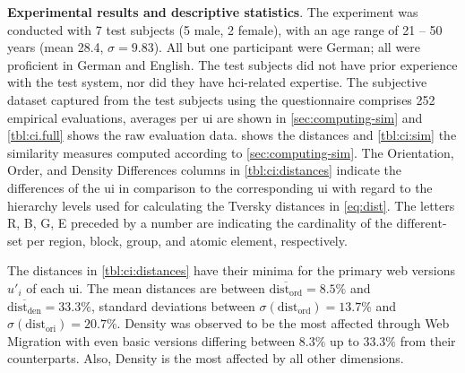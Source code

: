 \textbf{Experimental results and descriptive statistics}.
The experiment was conducted with 7 test subjects (5 male, 2 female), with an age range of 21 -- 50 years (mean 28.4, \(\sigma = 9.83\)).
All but one participant were German; all were proficient in German and English.
The test subjects did not have prior experience with the test system, nor did they have \gls{hci}-related expertise.
The subjective dataset captured from the test subjects using the questionnaire comprises 252 empirical evaluations, averages per \gls{ui} are shown in \cref{sec:computing-sim} and \cref{tbl:ci.full} shows the raw evaluation data.
 shows the distances and \cref{tbl:ci:sim} the similarity measures computed according to \cref{sec:computing-sim}.
The Orientation, Order, and Density Differences columns in \cref{tbl:ci:distances} indicate the differences of the \gls{ui} in comparison to the corresponding  \gls{ui} with regard to the hierarchy levels used for calculating the Tversky distances in \cref{eq:dist}.
The letters R, B, G, E preceded by a number are indicating the cardinality of the \(\text{different}\)-set per region, block, group, and atomic element, respectively.

The distances in \cref{tbl:ci:distances} have their minima for the primary \gls{web} versions \(u'_i\) of each \gls{ui}.
The mean distances are between \(\overline{\text{dist}_{\text{ord}}}=8.5\%\) and \(\overline{\text{dist}_{\text{den}}}=33.3\%\), standard deviations between \(\sigma(\text{dist}_{\text{ord}})=13.7\%\) and \(\sigma(\text{dist}_{\text{ori}})=20.7\%\).
Density was observed to be the most affected through \gls{Web Migration} with even basic versions differing between \(8.3\%\) up to \(33.3\%\) from their  counterparts.
Also, Density is the most affected by all other dimensions.

